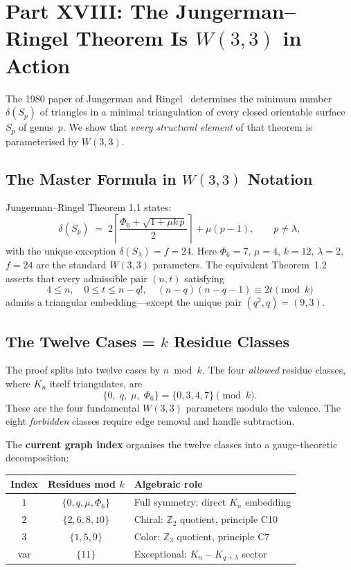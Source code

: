 \section{Part XVIII: The Jungerman--Ringel Theorem Is $W(3,3)$ in Action}

The 1980 paper of Jungerman and Ringel~\cite{JR1980} determines the minimum number $\delta(S_p)$ of triangles in a minimal triangulation of every closed orientable surface~$S_p$ of genus~$p$.  We show that \emph{every structural element} of that theorem is parameterised by $W(3,3)$.

\subsection{The Master Formula in $W(3,3)$ Notation}

Jungerman--Ringel Theorem 1.1 states:
\[
  \delta(S_p) \;=\; 2\!\left\lceil\frac{\Phi_6 + \sqrt{1 + \mu k\,p}}{2}\right\rceil + \mu(p - 1),
  \qquad p \neq \lambda,
\]
with the unique exception $\delta(S_\lambda) = f = 24$.  Here $\Phi_6 = 7$, $\mu = 4$, $k = 12$, $\lambda = 2$, $f = 24$ are the standard $W(3,3)$ parameters.  The equivalent Theorem~1.2 asserts that every admissible pair $(n,t)$ satisfying
\[
  4 \le n,\quad 0 \le t \le n - q!,\quad (n-q)(n-q-1) \equiv 2t \pmod{k}
\]
admits a triangular embedding---except the unique pair $(q^2, q) = (9,3)$.

\subsection{The Twelve Cases = $k$ Residue Classes}

The proof splits into twelve cases by $n \bmod k$.  The four \emph{allowed} residue classes, where $K_n$ itself triangulates, are
\[
  \{0,\; q,\; \mu,\; \Phi_6\} = \{0, 3, 4, 7\} \pmod{k}.
\]
These are the four fundamental $W(3,3)$ parameters modulo the valence.  The eight \emph{forbidden} classes require edge removal and handle subtraction.

\medskip\noindent
The \textbf{current graph index} organises the twelve classes into a gauge-theoretic decomposition:

\begin{center}
\begin{tabular}{ccl}
\hline
Index & Residues mod $k$ & Algebraic role \\ \hline
$1$ & $\{0, q, \mu, \Phi_6\}$ & Full symmetry: direct $K_n$ embedding \\
$2$ & $\{2, 6, 8, 10\}$ & Chiral: $\mathbb{Z}_2$ quotient, principle C10 \\
$3$ & $\{1, 5, 9\}$ & Color: $\mathbb{Z}_3$ quotient, principle C7 \\
var & $\{11\}$ & Exceptional: $K_n - K_{q+\lambda}$ sector \\
\hline
\end{tabular}
\end{center}

